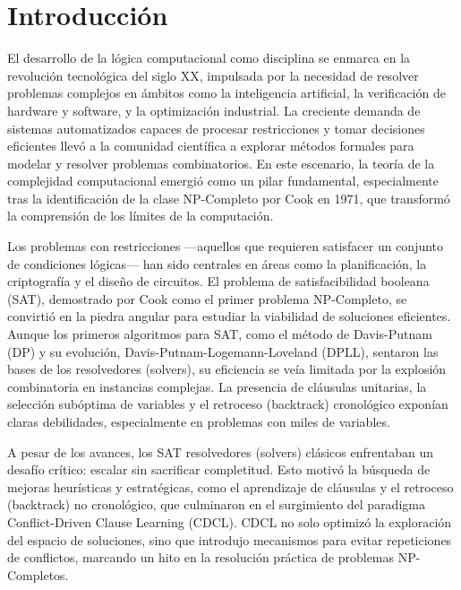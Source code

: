 \chapter*{Introducción}\label{chapter:introduction}
El desarrollo de la lógica computacional como disciplina se enmarca en la revolución tecnológica del siglo XX, impulsada por la necesidad de resolver problemas complejos en ámbitos como la inteligencia artificial, la verificación de hardware y software, y la optimización industrial. La creciente demanda de sistemas automatizados capaces de procesar restricciones y tomar decisiones eficientes llevó a la comunidad científica a explorar métodos formales para modelar y resolver problemas combinatorios. En este escenario, la teoría de la complejidad computacional emergió como un pilar fundamental, especialmente tras la identificación de la clase NP-Completo por Cook en 1971, que transformó la comprensión de los límites de la computación.

Los problemas con restricciones —aquellos que requieren satisfacer un conjunto de condiciones lógicas— han sido centrales en áreas como la planificación, la criptografía y el diseño de circuitos. El problema de satisfacibilidad booleana (SAT), demostrado por Cook como el primer problema NP-Completo, se convirtió en la piedra angular para estudiar la viabilidad de soluciones eficientes. Aunque los primeros algoritmos para SAT, como el método de Davis-Putnam (DP) y su evolución, Davis-Putnam-Logemann-Loveland (DPLL), sentaron las bases de los resolvedores (solvers), su eficiencia se veía limitada por la explosión combinatoria en instancias complejas. La presencia de cláusulas unitarias, la selección subóptima de variables y el retroceso (backtrack) cronológico exponían claras debilidades, especialmente en problemas con miles de variables.

A pesar de los avances, los SAT resolvedores (solvers) clásicos enfrentaban un desafío crítico: escalar sin sacrificar completitud. Esto motivó la búsqueda de mejoras heurísticas y estratégicas, como el aprendizaje de cláusulas y el retroceso (backtrack) no cronológico, que culminaron en el surgimiento del paradigma Conflict-Driven Clause Learning (CDCL). CDCL no solo optimizó la exploración del espacio de soluciones, sino que introdujo mecanismos para evitar repeticiones de conflictos, marcando un hito en la resolución práctica de problemas NP-Completos. 

